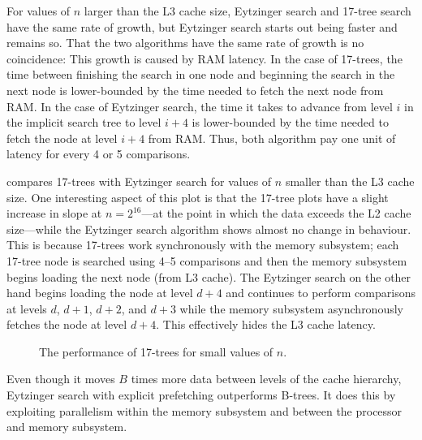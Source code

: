 \documentclass{patmorin}
\begin{document}
For values of $n$ larger than the L3 cache size, Eytzinger search and
17-tree search have the same rate of growth, but Eytzinger search starts
out being faster and remains so.  That the two algorithms have the same
rate of growth is no coincidence: This growth is caused by RAM latency.
In the case of 17-trees, the time between finishing the search in one
node and beginning the search in the next node is lower-bounded by the
time needed to fetch the next node from RAM.  In the case of Eytzinger
search, the time it takes to advance from level $i$ in the implicit
search tree to level $i+4$ is lower-bounded by the time needed to fetch
the node at level $i+4$ from RAM.  Thus, both algorithm pay one unit of
latency for every 4 or 5 comparisons.

 compares 17-trees with Eytzinger search for values
of $n$ smaller than the L3 cache size.  One interesting aspect of
this plot is that the 17-tree plots have a slight increase in slope
at $n=2^{16}$---at the point in which the data exceeds the L2 cache
size---while the Eytzinger search algorithm shows almost no change in
behaviour.  This is because 17-trees work synchronously
with the memory subsystem; each 17-tree node is searched using 4--5
comparisons and then the memory subsystem begins loading the next node
(from L3 cache).  The Eytzinger search on the other hand begins loading
the node at level $d+4$ and continues to perform comparisons at levels $d$,
$d+1$, $d+2$, and $d+3$ while the memory subsystem asynchronously fetches
the node at level $d+4$. This effectively hides the L3 cache latency.

\begin{figure}
   \caption{The performance of 17-trees for small values of $n$.}
\end{figure}

\begin{lesson}
  Even though it moves $B$ times more data between levels of the cache
  hierarchy, Eytzinger search with explicit prefetching outperforms
  B-trees.  It does this by exploiting parallelism within the memory
  subsystem and between the processor and memory subsystem.
\end{lesson}

%
%
%
%
%
%
%
\end{document}
